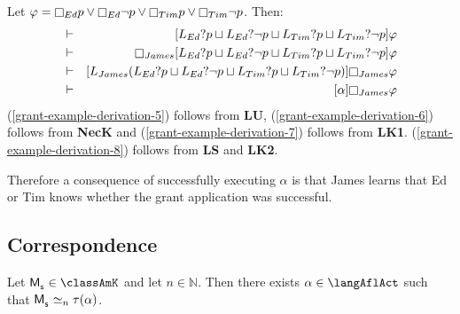 \begin{example}
Let $\phi = \necessary[Ed] \atomP \lor  \necessary[Ed] \neg \atomP \lor \necessary[Tim] \atomP \lor \necessary[Tim] \neg \atomP$. Then:
\begin{eqnarray}
    &\proves& \actionA{\learns[Ed] \test{\atomP} \choice \learns[Ed] \test{\neg \atomP} \choice \learns[Tim] \test{\atomP} \choice \learns[Tim] \test{\neg \atomP}} \phi\label{grant-example-derivation-5}\\
    &\proves& \necessary[James] \actionA{\learns[Ed] \test{\atomP} \choice \learns[Ed] \test{\neg \atomP} \choice \learns[Tim] \test{\atomP} \choice \learns[Tim] \test{\neg \atomP}} \phi\label{grant-example-derivation-6}\\
    &\proves& \actionA{\learns[James] (\learns[Ed] \test{\atomP} \choice \learns[Ed] \test{\neg \atomP} \choice \learns[Tim] \test{\atomP} \choice \learns[Tim] \test{\neg \atomP})} \necessary[James] \phi\label{grant-example-derivation-7}\\
    &\proves& \actionA{\alpha} \necessary[James] \phi\label{grant-example-derivation-8}
\end{eqnarray}
(\ref{grant-example-derivation-5}) follows from {\bf LU},
(\ref{grant-example-derivation-6}) follows from {\bf NecK} and
(\ref{grant-example-derivation-7}) follows from {\bf LK1}.
(\ref{grant-example-derivation-8}) follows from {\bf LS} and {\bf LK2}.

Therefore a consequence of successfully executing $\alpha$ is that James learns that Ed or Tim knows whether the grant application was successful.
\end{example}

\subsection{Correspondence}

\begin{theorem}\label{afl-k-correspondence}
Let $\aPModel{\aStateS} \in \classAmK$ and let $n \in \mathbb{N}$. 
Then there exists $\alpha \in \langAflAct$ such that $\aPModel{\aStateS} \bisimilar[n] \tau(\alpha)$.
\end{theorem}

